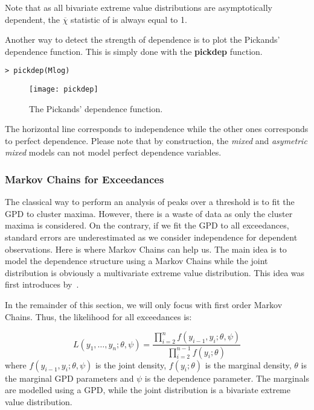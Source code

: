 \documentclass[11pt,a4paper]{article}
\numberwithin{equation}{section}
\theoremstyle{definition}
\begin{document}
Note that as all bivariate extreme value distributions are
asymptotically dependent, the $\overline{\chi}$ statistic of
\citet{Coles1999} is always equal to 1.

Another way to detect the strength of dependence is to plot the
Pickands' dependence function. This is simply done with the
\textbf{pickdep} function.
\begin{verbatim}
> pickdep(Mlog)
\end{verbatim}

\begin{figure}
  \centering
  \texttt{[image: pickdep]}
  \caption{The Pickands' dependence function.}
  \label{fig:pickdep}
\end{figure}

The horizontal line corresponds to independence while the
other ones corresponds to perfect dependence. Please note that by
construction, the \emph{mixed} and \emph{asymetric mixed} models can
not model perfect dependence variables.

\subsubsection{Markov Chains for Exceedances}

The classical way to perform an analysis of peaks over a threshold is
to fit the GPD to cluster maxima. However, there is a waste of data as
only the cluster maxima is considered. On the contrary, if we fit the
GPD to all exceedances, standard errors are underestimated as we
consider independence for dependent observations. Here is where Markov
Chains can help us. The main idea is to model the dependence structure
using a Markov Chains while the joint distribution is obviously a
multivariate extreme value distribution. This idea was first
introduces by~\citet{Smith1997}.

In the remainder of this section, we will only focus with first order
Markov Chains. Thus, the likelihood for all exceedances is:

\begin{equation}
  \label{eq:likMC}
  L(y_1, \ldots, y_n; \theta, \psi) = \frac{\prod_{i=2}^n
    f(y_{i-1},y_i;\theta, \psi)} {\prod_{i=2}^{n-1} f(y_i;\theta)}
\end{equation}
where $f(y_{i-1},y_i;\theta, \psi)$ is the joint density,
$f(y_i;\theta)$ is the marginal density, $\theta$ is the marginal GPD
parameters and $\psi$ is the dependence parameter. The marginals are
modelled using a GPD, while the joint distribution is a bivariate
extreme value distribution.
\end{document}
